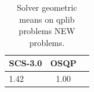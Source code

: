 \begin{table}
\centering
\caption{Solver geometric means on qplib problems NEW problems.}
\label{t-qplib problems NEW-geom_mean}
\begin{tabular}{lcc}
\toprule
 SCS-3.0 &  OSQP \\
\midrule
    1.42 &  1.00 \\
\bottomrule
\end{tabular}
\end{table}
